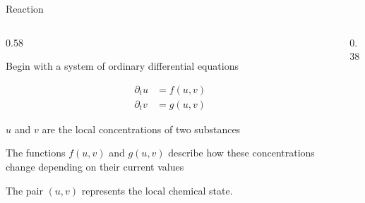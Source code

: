 \begin{frame}{Reaction}

  \vspace{-0.16cm}

  \begin{columns}[c,onlytextwidth]

    \begin{column}{0.58\textwidth}
      {\color{HydraMuted}\fontsize{8.2}{10.2}\selectfont
        Begin with a system of ordinary differential equations
      \par}

      \vspace{-0.22cm}

      {\color{HydraWhite}\fontsize{10.4}{13.2}\selectfont
      \begin{align*}
        \partial_t u&=f(u,v)
        \\
        \partial_t v&=g(u,v)
      \end{align*}
      }

      \vspace{-0.28cm}

      {\color{HydraWhite}\fontsize{8.2}{10.2}\selectfont
        $u$ and $v$ are the local concentrations of two substances
      \par}

      \vspace{0.10cm}

      {\color{HydraMuted}\fontsize{8.2}{10.2}\selectfont
        The functions $f(u,v)$ and $g(u,v)$ describe how these
        concentrations change depending on their current values
      \par}

      \vspace{0.24cm}

        {The pair $(u,v)$ represents the local chemical state.}

      \vspace{-0.28cm}

    \end{column}

    \begin{column}{0.38\textwidth}
      \centering

      \begin{tikzpicture}[x=0.86cm,y=0.82cm]


\end{tikzpicture}
\end{column}
\end{columns}
\end{frame}
